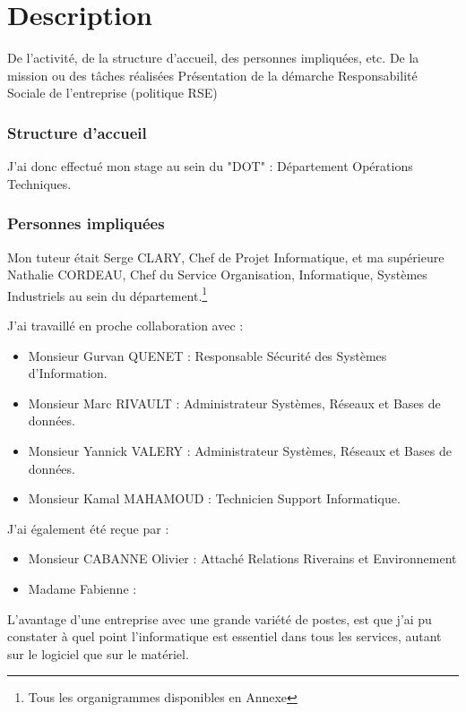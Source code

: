 \section{Description}

De l’activité, de la structure d’accueil, des 
personnes impliquées, etc.
De la mission ou des tâches réalisées
Présentation de la démarche Responsabilité    
Sociale de l’entreprise (politique RSE)


\subsubsection*{Structure d'accueil}

J'ai donc effectué mon stage au sein du "DOT" : Département Opérations Techniques.

\subsubsection*{Personnes impliquées}


Mon tuteur était Serge CLARY, Chef de Projet Informatique, et ma supérieure Nathalie CORDEAU, Chef du Service Organisation, Informatique, Systèmes Industriels au sein du département.\footnote{Tous les organigrammes disponibles en Annexe}

J'ai travaillé en proche collaboration  avec :\newline
\begin{itemize}
    \item Monsieur Gurvan QUENET : Responsable Sécurité des Systèmes d'Information.
    \item Monsieur Marc RIVAULT : Administrateur Systèmes, Réseaux et Bases de données.
    \item Monsieur Yannick VALERY : Administrateur Systèmes, Réseaux et Bases de données.
    \item Monsieur Kamal MAHAMOUD : Technicien Support Informatique.
\end{itemize}

J'ai également été reçue par :

\begin{itemize}
    \item Monsieur CABANNE Olivier : Attaché Relations Riverains et Environnement
    \item Madame    Fabienne : 
\end{itemize}


L'avantage d'une entreprise avec une grande variété de postes, est que j'ai pu constater à quel point l'informatique est essentiel dans tous les services, autant sur le logiciel que sur le matériel.

